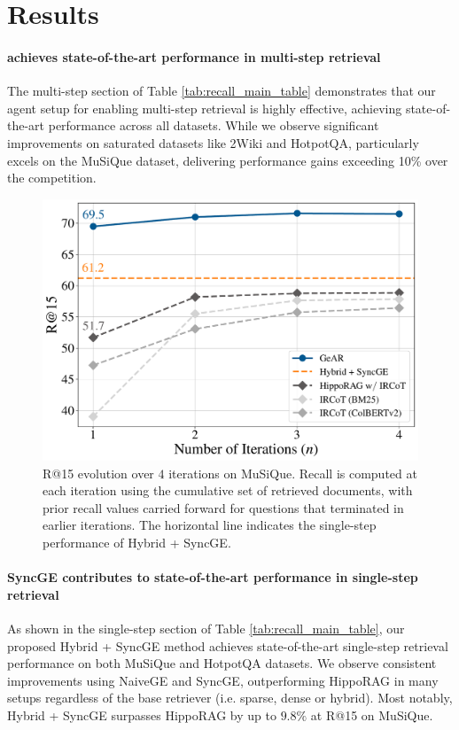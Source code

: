 \section{Results}



\paragraph{\gear achieves state-of-the-art performance in multi-step retrieval}
The multi-step section of Table \ref{tab:recall_main_table} demonstrates that our agent setup for enabling multi-step retrieval is highly effective, achieving state-of-the-art performance across all datasets. While we observe significant improvements on saturated datasets like 2Wiki and HotpotQA, \gear particularly excels on the MuSiQue dataset, delivering performance gains exceeding 10\% over the competition.


\begin{figure}[t]
\includegraphics[width=\columnwidth]{figures/experiments/recall_evolution_across_agent_iterations_4_iters.pdf}
\caption{\label{fig:recall_across_iterations}R@15 evolution over $4$ iterations on MuSiQue. Recall is computed at each iteration using the cumulative set of retrieved documents, with prior recall values carried forward for questions that terminated in earlier iterations. The horizontal line indicates the single-step performance of Hybrid + SyncGE.}
\end{figure}

\paragraph{SyncGE contributes to state-of-the-art performance in single-step retrieval}
As shown in the single-step section of Table \ref{tab:recall_main_table}, our proposed Hybrid + SyncGE method achieves state-of-the-art single-step retrieval performance on both MuSiQue and HotpotQA datasets. We observe consistent improvements using NaiveGE and SyncGE, outperforming HippoRAG in many setups regardless of the base retriever (i.e. sparse, dense or hybrid). Most notably, Hybrid + SyncGE surpasses HippoRAG by up to $9.8\%$ at R@15 on MuSiQue.




